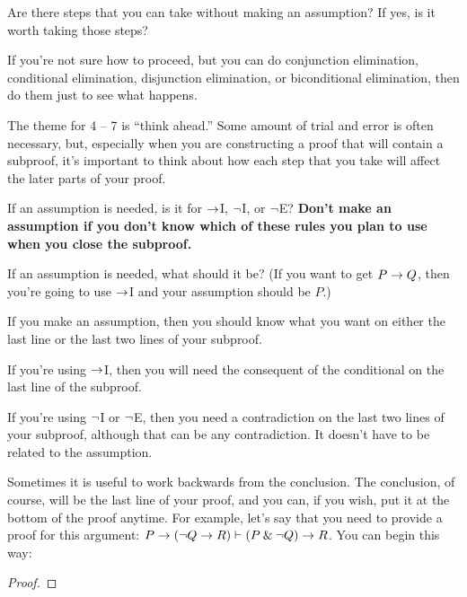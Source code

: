 {{{{{{{{{\begin{earg}
\item[\ex{18-2}] Are there steps that you can take without making an assumption? If yes, is it worth taking those steps?
\medskip

\item[\ex{18-3}] If you’re not sure how to proceed, but you can do conjunction elimination, conditional elimination, disjunction elimination, or biconditional elimination, then do them just to see what happens.
\end{earg}

\noindent The theme for 4 -- 7 is ``think ahead.'' Some amount of trial and error is often necessary, but, especially when you are constructing a proof that will contain a subproof, it's important to think about how each step that you take will affect the later parts of your proof.

\begin{earg}
\item[\ex{18-4}] If an assumption is needed, is it for $\rightarrow$I, ${\neg}$I, or ${\neg}$E? \textbf{Don't make an assumption if you don't know which of these rules you plan to use when you close the subproof.}
\medskip

\item[\ex{18-5}] If an assumption is needed, what should it be? (If you want to get $P \rightarrow Q$, then you’re going to use $\rightarrow$I and your assumption should be $P$.)
\medskip

\item[\ex{18-6}] If you make an assumption, then you should know what you want on either the last line or the last two lines of your subproof.
\begin{earg}
\item[a.] If you’re using $\rightarrow$I, then you will need the consequent of the conditional on the last line of the subproof. 
\item[b.] If you’re using ${\neg}$I or ${\neg}$E, then you need a contradiction on the last two lines of your subproof, although that can be any contradiction. It doesn't have to be related to the assumption.
\end{earg}
\medskip

\item[\ex{18-3a}] Sometimes it is useful to work backwards from the conclusion. The conclusion, of course, will be the last line of your proof, and you can, if you wish, put it at the bottom of the proof anytime. For example, let's say that you need to provide a proof for this argument: $P \rightarrow ({\neg} Q \rightarrow R) \vdash (P \mathbin{\&} {\neg} Q) \rightarrow R$. You can begin this way:
\begin{proof}
	 \pr{}
\end{proof}
\medskip


\end{earg}}}}}}}}}}

